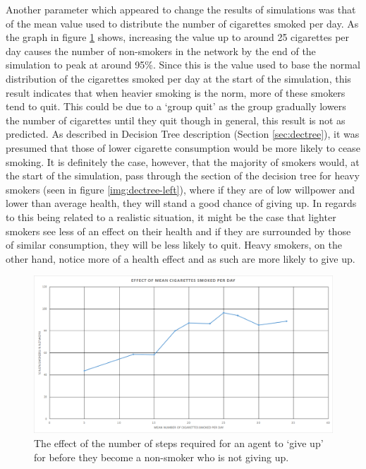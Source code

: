 \documentclass[]{report}
\begin{document}
Another parameter which appeared to change the results of simulations was that of the mean value used to distribute the number of cigarettes smoked per day. As the graph in figure \ref{img:mean-cig} shows, increasing the value up to around 25 cigarettes per day causes the number of non-smokers in the network by the end of the simulation to peak at around 95\%. Since this is the value used to base the normal distribution of the cigarettes smoked per day at the start of the simulation, this result indicates that when heavier smoking is the norm, more of these smokers tend to quit. This could be due to a `group quit' as the group gradually lowers the number of cigarettes until they quit though in general, this result is not as predicted. As described in Decision Tree description (Section \ref{sec:dectree}), it was presumed that those of lower cigarette consumption would be more likely to cease smoking. It is definitely the case, however, that the majority of smokers would, at the start of the simulation, pass through the section of the decision tree for heavy smokers (seen in figure \ref{img:dectree-left}), where if they are of low willpower and lower than average health, they will stand a good chance of giving up. In regards to this being related to a realistic situation, it might be the case that lighter smokers see less of an effect on their health and if they are surrounded by those of similar consumption, they will be less likely to quit. Heavy smokers, on the other hand, notice more of a health effect and as such are more likely to give up.

\begin{figure}
\label{img:mean-cig}
\begin{center}
\includegraphics[width=\textwidth]{mean-cig.png}
\end{center}
\caption{The effect of the number of steps required for an agent to `give up' for before they become a non-smoker who is not giving up.}
\end{figure}
\end{document}
